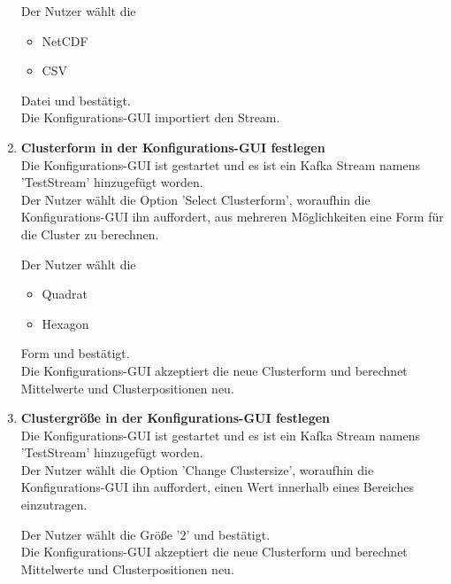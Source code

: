 \begin{enumerate}[label=\textbf{TI\arabic{enumi}0}]
		Der Nutzer wählt die
		\begin{itemize}
		\item NetCDF
		\item CSV
		\end{itemize}
		Datei und bestätigt.\\
		Die Konfigurations-GUI importiert den Stream.
	\item \textbf{Clusterform in der Konfigurations-GUI festlegen}\\
		Die Konfigurations-GUI ist gestartet und es ist ein Kafka Stream namens 'TestStream' hinzugefügt worden.\\
		Der Nutzer wählt die Option 'Select Clusterform', woraufhin die Konfigurations-GUI ihn auffordert, aus mehreren Möglichkeiten eine Form für die Cluster zu berechnen.\par
		
		Der Nutzer wählt die
		\begin{itemize}
		\item Quadrat
		\item Hexagon
		\end{itemize}
		Form und bestätigt.\\
		Die Konfigurations-GUI akzeptiert die neue Clusterform und berechnet Mittelwerte und Clusterpositionen neu.
	\item \textbf{Clustergröße in der Konfigurations-GUI festlegen}\\
		Die Konfigurations-GUI ist gestartet und es ist ein Kafka Stream namens 'TestStream' hinzugefügt worden.\\
		Der Nutzer wählt die Option 'Change Clustersize', woraufhin die Konfigurations-GUI ihn auffordert, einen Wert innerhalb eines Bereiches einzutragen.\par
		
		Der Nutzer wählt die Größe '2' und bestätigt.\\
		Die Konfigurations-GUI akzeptiert die neue Clusterform und berechnet Mittelwerte und Clusterpositionen neu.

\end{enumerate}

